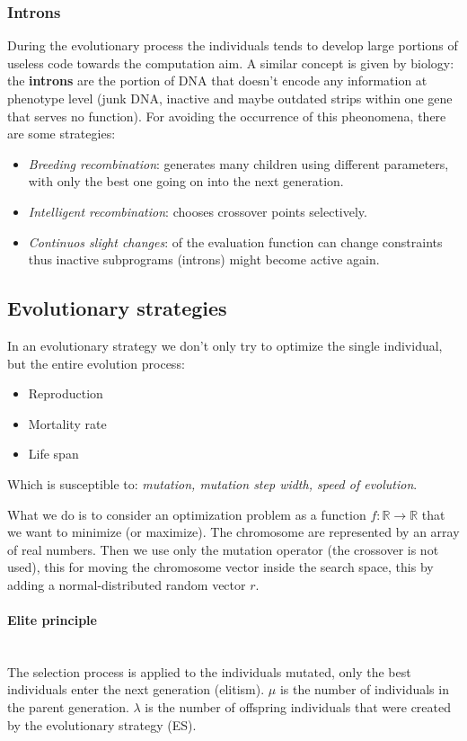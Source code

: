 \documentclass{article}
\begin{document}
\subsubsection{Introns}
During the evolutionary process the individuals tends to develop large portions of useless
code towards the computation aim. A similar concept is given by biology: the \textbf{introns}
are the portion of DNA that doesn't encode any information at phenotype level (junk DNA,
inactive and maybe outdated strips within one gene that serves no function). For avoiding
the occurrence of this pheonomena, there are some strategies:
\begin{itemize}
    \item \textit{Breeding recombination}: generates many children
    using different parameters, with only the best one
    going on into the next generation.
    \item \textit{Intelligent recombination}:  chooses crossover points
    selectively.
    \item \textit{Continuos slight changes}:  of the evaluation function
    can change constraints thus inactive subprograms
    (introns) might become active again.
\end{itemize}

\subsection{Evolutionary strategies}
In an evolutionary strategy we don't only try to optimize the single individual, but the entire
evolution process:
\begin{itemize}
    \item Reproduction
    \item Mortality rate
    \item Life span
\end{itemize}
Which is susceptible to: \textit{mutation, mutation step width, speed of evolution}.

What we do is to consider an optimization problem as a function $f:\mathbb{R}\rightarrow\mathbb{R}$
that we want to minimize (or maximize). The chromosome are represented by an array of real numbers.
Then we use only the mutation operator (the crossover is not used), this for moving the chromosome
vector inside the search space, this by adding a normal-distributed random vector $r$.

\paragraph{Elite principle}\mbox{}\\
The selection process is applied to the individuals mutated, only the best individuals
enter the next generation (elitism). $\mu$ is the number of individuals in the parent generation.
$\lambda$ is the number of offspring individuals that were created by the evolutionary strategy (ES).
\end{document}
